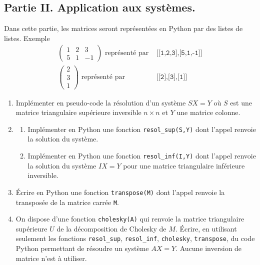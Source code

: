 \subsection*{Partie II. Application aux systèmes.}
Dans cette partie, les matrices seront représentées en Python par des listes de listes.
 Exemple
 \begin{align*}
\begin{pmatrix}
 1 & 2 & 3 \\ 5 & 1 &-1
\end{pmatrix}
\text{ représenté par }& \texttt{[[1,2,3],[5,1,-1]]} \\
\begin{pmatrix}
 2 \\ 3 \\ 1
\end{pmatrix}
\text{ représenté par }& \texttt{[[2],[3],[1]]}
 \end{align*}
\begin{enumerate}
 \item Implémenter en pseudo-code la résolution d'un système $SX=Y$ où $S$ est une matrice triangulaire supérieure inversible $n\times n$ et $Y$ une matrice colonne.
 \item 
    \begin{enumerate}
       \item Implémenter en Python une fonction \texttt{resol\_sup(S,Y)} dont l'appel renvoie la solution du système. 
       \item Implémenter en Python une fonction \texttt{resol\_inf(I,Y)} dont l'appel renvoie la solution du système $IX=Y$ pour une matrice triangulaire inférieure inversible. 
    \end{enumerate}
  \item \'Ecrire en Python une fonction \texttt{transpose(M)} dont l'appel renvoie la transposée de la matrice carrée \texttt{M}.
  \item On dispose d'une fonction \texttt{cholesky(A)} qui renvoie la matrice triangulaire supérieure $U$ de la décomposition de Cholesky de $M$. \'Ecrire, en utilisant seulement les fonctions \texttt{resol\_sup}, \texttt{resol\_inf}, \texttt{cholesky}, \texttt{transpose}, du code Python permettant de résoudre un système $AX = Y$. Aucune inversion de matrice n'est à utiliser.    
 \end{enumerate}
 
